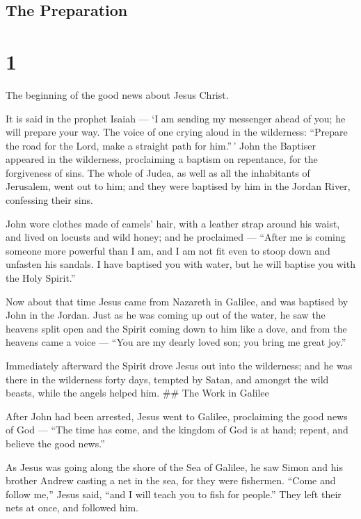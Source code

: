 \hypertarget{the-preparation}{%
\subsection{The Preparation}\label{the-preparation}}

\hypertarget{section}{%
\section{1}\label{section}}

 The beginning of the good news about Jesus Christ.

 It is said in the prophet Isaiah --- `I am sending my
messenger ahead of you; he will prepare your way.  The voice
of one crying aloud in the wilderness: ``Prepare the road for the Lord,
make a straight path for him.''\,'  John the Baptiser
appeared in the wilderness, proclaiming a baptism on repentance, for the
forgiveness of sins.  The whole of Judea, as well as all the
inhabitants of Jerusalem, went out to him; and they were baptised by him
in the Jordan River, confessing their sins.

 John wore clothes made of camels' hair, with a leather
strap around his waist, and lived on locusts and wild honey;
 and he proclaimed --- ``After me is coming someone more
powerful than I am, and I am not fit even to stoop down and unfasten his
sandals.  I have baptised you with water, but he will
baptise you with the Holy Spirit.''

 Now about that time Jesus came from Nazareth in Galilee,
and was baptised by John in the Jordan.  Just as he was
coming up out of the water, he saw the heavens split open and the Spirit
coming down to him like a dove,  and from the heavens came
a voice --- ``You are my dearly loved son; you bring me great joy.''

 Immediately afterward the Spirit drove Jesus out into the
wilderness;  and he was there in the wilderness forty days,
tempted by Satan, and amongst the wild beasts, while the angels helped
him. \#\# The Work in Galilee

 After John had been arrested, Jesus went to Galilee,
proclaiming the good news of God ---  ``The time has come,
and the kingdom of God is at hand; repent, and believe the good news.''

 As Jesus was going along the shore of the Sea of Galilee,
he saw Simon and his brother Andrew casting a net in the sea, for they
were fishermen.  ``Come and follow me,'' Jesus said, ``and
I will teach you to fish for people.''  They left their
nets at once, and followed him.

